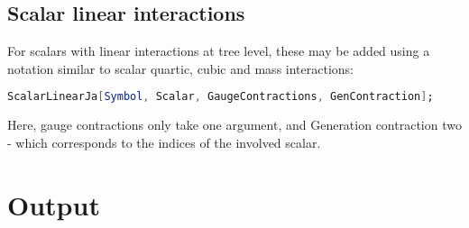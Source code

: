 \documentclass{scrartcl}
\begin{document}
\subsection{Scalar linear interactions}
For scalars with linear interactions at tree level, these may be added using a notation similar to scalar quartic, cubic and mass interactions:
\begin{lstlisting}[language=mathematica,mathescape,columns=flexible,backgroundcolor=\color{light-gray}]
ScalarLinearJa[Symbol, Scalar, GaugeContractions, GenContraction];
\end{lstlisting}
Here, gauge contractions only take one argument, and Generation contraction two - which corresponds to the indices of the involved scalar.
\newpage
\section{Output}
\end{document}
